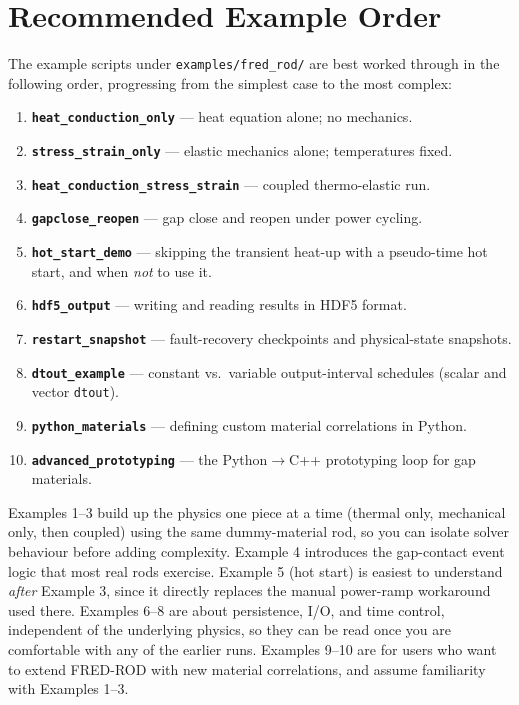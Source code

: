 \documentclass[11pt,a4paper]{article}
\begin{document}
\section{Recommended Example Order}
\label{sec:rod-order}

The example scripts under \texttt{examples/fred\_rod/} are best worked
through in the following order, progressing from the simplest case to the
most complex:

\begin{enumerate}
  \item \textbf{\texttt{heat\_conduction\_only}} --- heat equation alone; no mechanics.
  \item \textbf{\texttt{stress\_strain\_only}} --- elastic mechanics alone; temperatures fixed.
  \item \textbf{\texttt{heat\_conduction\_stress\_strain}} --- coupled thermo-elastic run.
  \item \textbf{\texttt{gapclose\_reopen}} --- gap close and reopen under power cycling.
  \item \textbf{\texttt{hot\_start\_demo}} --- skipping the transient heat-up with a
        pseudo-time hot start, and when \emph{not} to use it.
  \item \textbf{\texttt{hdf5\_output}} --- writing and reading results in HDF5 format.
  \item \textbf{\texttt{restart\_snapshot}} --- fault-recovery checkpoints and physical-state snapshots.
  \item \textbf{\texttt{dtout\_example}} --- constant vs.\ variable output-interval schedules (scalar and vector \texttt{dtout}).
  \item \textbf{\texttt{python\_materials}} --- defining custom material correlations in Python.
  \item \textbf{\texttt{advanced\_prototyping}} --- the Python$\to$C++ prototyping loop for gap materials.
\end{enumerate}

\begin{infobox}
  Examples 1--3 build up the physics one piece at a time (thermal only,
  mechanical only, then coupled) using the same dummy-material rod, so you
  can isolate solver behaviour before adding complexity.  Example 4
  introduces the gap-contact event logic that most real rods exercise.
  Example 5 (hot start) is easiest to understand \emph{after} Example 3,
  since it directly replaces the manual power-ramp workaround used there.
  Examples 6--8 are about persistence, I/O, and time control, independent of
  the underlying physics, so they can be read once you are comfortable with
  any of the earlier runs. Examples 9--10 are for users who want to extend
  FRED-ROD with new material correlations, and assume familiarity with
  Examples 1--3.
\end{infobox}
\end{document}
